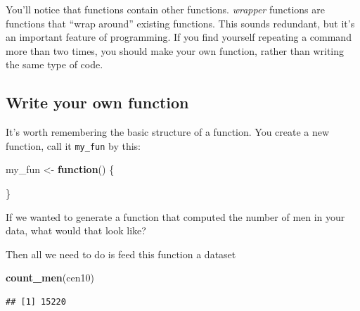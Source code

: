 \documentclass[
]{book}
\newenvironment{Shaded}{\begin{snugshade}}{\end{snugshade}}
\newcommand{\ControlFlowTok}[1]{\textcolor[rgb]{0.13,0.29,0.53}{\textbf{#1}}}
\newcommand{\KeywordTok}[1]{\textcolor[rgb]{0.13,0.29,0.53}{\textbf{#1}}}
\newcommand{\NormalTok}[1]{#1}
\newcommand{\OperatorTok}[1]{\textcolor[rgb]{0.81,0.36,0.00}{\textbf{#1}}}
\newcommand{\StringTok}[1]{\textcolor[rgb]{0.31,0.60,0.02}{#1}}
\theoremstyle{definition}
\theoremstyle{definition}
\theoremstyle{definition}
\theoremstyle{remark}
\begin{document}
You'll notice that functions contain other functions. \emph{wrapper} functions are functions that ``wrap around'' existing functions. This sounds redundant, but it's an important feature of programming. If you find yourself repeating a command more than two times, you should make your own function, rather than writing the same type of code.

\hypertarget{write-your-own-function}{%
\subsection{Write your own function}\label{write-your-own-function}}

It's worth remembering the basic structure of a function. You create a new function, call it \texttt{my\_fun} by this:

\begin{Shaded}
\begin{Highlighting}[]
\NormalTok{my\_fun <{-}}\StringTok{ }\ControlFlowTok{function}\NormalTok{() \{}
  
\NormalTok{\}}
\end{Highlighting}
\end{Shaded}

If we wanted to generate a function that computed the number of men in your data, what would that look like?

\begin{Shaded}
\end{Shaded}

Then all we need to do is feed this function a dataset

\begin{Shaded}
\begin{Highlighting}[]
\KeywordTok{count\_men}\NormalTok{(cen10)}
\end{Highlighting}
\end{Shaded}

\begin{verbatim}
## [1] 15220
\end{verbatim}
\end{document}
